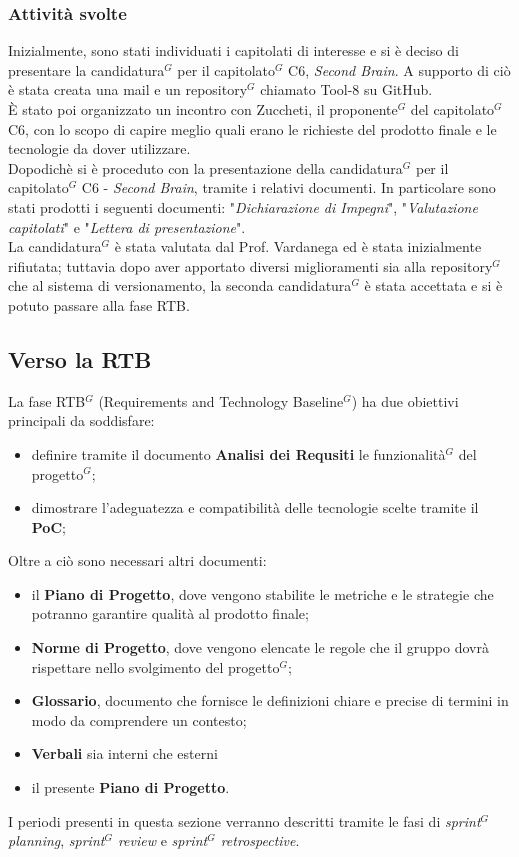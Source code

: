 \documentclass[a4paper,10pt]{article}
\begin{document}
\subsubsection{Attività svolte}
Inizialmente, sono stati individuati i capitolati di interesse e si è deciso di presentare la candidatura$^G$ per il capitolato$^G$ C6, \textit{Second Brain}. A supporto di ciò è stata creata una mail e un repository$^G$ chiamato Tool-8 su GitHub.\\ 
È stato poi organizzato un incontro con Zuccheti, il proponente$^G$ del capitolato$^G$ C6, con lo scopo di capire meglio quali erano le richieste del prodotto finale e le tecnologie da dover utilizzare. \\
Dopodichè si è proceduto con la presentazione della candidatura$^G$ per il capitolato$^G$ C6 - \textit{Second Brain}, tramite i relativi documenti. In particolare sono stati prodotti i seguenti documenti: "\textit{Dichiarazione di Impegni}", "\textit{Valutazione capitolati}" e "\textit{Lettera di presentazione}".\\
La candidatura$^G$ è stata valutata dal Prof. Vardanega ed è stata inizialmente rifiutata; tuttavia dopo aver apportato diversi miglioramenti sia alla repository$^G$ che al sistema di versionamento, la seconda candidatura$^G$ è stata accettata e si è potuto passare alla fase RTB.

\subsection{Verso la RTB}
La fase RTB$^G$ (Requirements and Technology Baseline$^G$) ha due obiettivi principali da soddisfare:
\begin{itemize}
  \item definire tramite il documento \textbf{Analisi dei Requsiti} le funzionalità$^G$ del progetto$^G$;
  \item dimostrare l'adeguatezza e compatibilità delle tecnologie scelte tramite il \textbf{PoC};
\end{itemize}
Oltre a ciò sono necessari altri documenti:
\begin{itemize}
  \item il \textbf{Piano di Progetto}, dove vengono stabilite le metriche e le strategie che potranno garantire qualità al prodotto finale;
  \item \textbf{Norme di Progetto}, dove vengono elencate le regole che il gruppo dovrà rispettare nello svolgimento del progetto$^G$;
  \item \textbf{Glossario}, documento che fornisce le definizioni chiare e precise di termini in modo da comprendere un contesto;
  \item \textbf{Verbali} sia interni che esterni
  \item il presente \textbf{Piano di Progetto}.
\end{itemize}
I periodi presenti in questa sezione verranno descritti tramite le fasi di \textit{sprint$^G$ planning}, \textit{sprint$^G$ review} e \textit{sprint$^G$ retrospective}.
\end{document}
